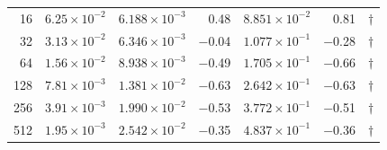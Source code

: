 {\begin{table}[htbp]
\begin{tabular}{rrrrrrr}
 16 & $6.25\times10^{-2}$ & $6.188\times10^{-3}$ & 0.48 & $8.851\times10^{-2}$ & 0.81 & $\dagger$ \\
 32 & $3.13\times10^{-2}$ & $6.346\times10^{-3}$ & $-$0.04 & $1.077\times10^{-1}$ & $-$0.28 & $\dagger$ \\
 64 & $1.56\times10^{-2}$ & $8.938\times10^{-3}$ & $-$0.49 & $1.705\times10^{-1}$ & $-$0.66 & $\dagger$ \\
128 & $7.81\times10^{-3}$ & $1.381\times10^{-2}$ & $-$0.63 & $2.642\times10^{-1}$ & $-$0.63 & $\dagger$ \\
256 & $3.91\times10^{-3}$ & $1.990\times10^{-2}$ & $-$0.53 & $3.772\times10^{-1}$ & $-$0.51 & $\dagger$ \\
512 & $1.95\times10^{-3}$ & $2.542\times10^{-2}$ & $-$0.35 & $4.837\times10^{-1}$ & $-$0.36 & $\dagger$ \\
\bottomrule
\end{tabular}
\end{table}
}


